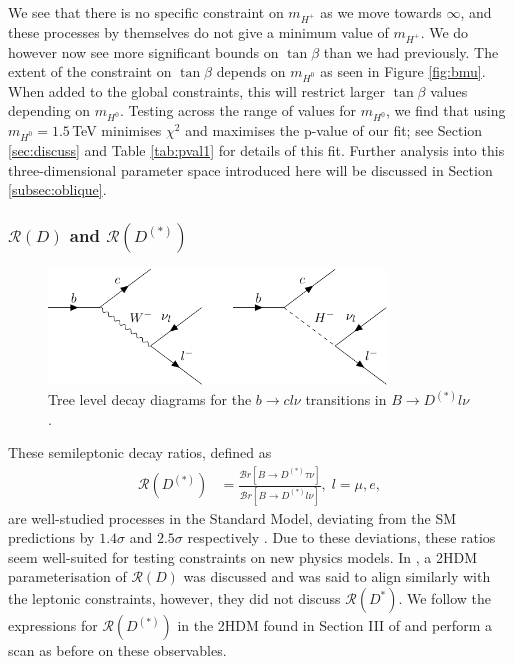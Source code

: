 \documentclass[a4paper,12pt]{article}
\begin{document}
We see that there is no specific constraint on $m_{H^+}$ as we move towards $\infty$, and these processes by themselves do not give a minimum value of $m_{H^+}$. 
We do however now see more significant bounds on $\tan\beta$ than we had previously. 
The extent of the constraint on $\tan\beta$ depends on $m_{H^0}$ as seen in Figure \ref{fig:bmu}.
When added to the global constraints, this will restrict larger $\tan\beta$ values depending on $m_{H^0}$.
Testing across the range of values for $m_{H^0}$, we find that using $m_{H^0}=1.5\,$TeV minimises $\chi^2$ and maximises the p-value of our fit; see Section \ref{sec:discuss} and Table \ref{tab:pval1} for details of this fit.
Further analysis into this three-dimensional parameter space introduced here will be discussed in Section \ref{subsec:oblique}.

\subsubsection{$\mathcal{R}(D)$ and $\mathcal{R}(D^{(*)})$}
\begin{figure}[H]
    \centering
    \includegraphics[width=0.8\textwidth]{bclnu.pdf}
    \caption{\label{fig:bclnu}Tree level decay diagrams for the $b\to cl\nu$ transitions in $B\to D^{(*)}l\nu$.}
\end{figure}
These semileptonic decay ratios, defined as
\begin{align}
    \mathcal{R}(D^{(*)}) &=\frac{\mathcal{B}r[B\to D^{(*)}\tau\nu]}{\mathcal{B}r[B\to D^{(*)}l\nu]},\; l = \mu,e,
\end{align}
are well-studied processes in the Standard Model, deviating from the SM predictions by $1.4\sigma$ and $2.5\sigma$ respectively \cite{pdg}. 
Due to these deviations, these ratios seem well-suited for testing constraints on new physics models. 
In \cite{desc}, a 2HDM parameterisation of $\mathcal{R}(D)$ was discussed and was said to align similarly with the leptonic constraints, however, they did not discuss $\mathcal{R}(D^*)$. 
We follow the expressions for $\mathcal{R}(D^{(*)})$ in the 2HDM found in Section III of \cite{rds} and perform a scan as before on these observables. 
\end{document}
